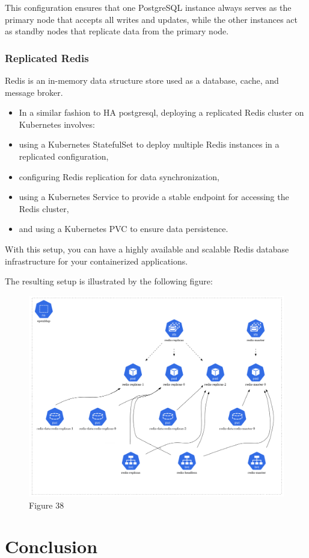 This configuration ensures that one PostgreSQL instance always serves as the primary node that accepts all writes and updates, while the other instances act as standby nodes that replicate data from the primary node. 

\subsubsection{Replicated Redis }

Redis is an in-memory data structure store used as a database, cache, and message broker. 
\begin{itemize}[label={--}]
\item In a similar fashion to HA postgresql, deploying a replicated Redis cluster on Kubernetes involves: 
\item using a Kubernetes StatefulSet to deploy multiple Redis instances in a replicated configuration, 
\item configuring Redis replication for data synchronization, 
\item using a Kubernetes Service to provide a stable endpoint for accessing the Redis cluster, 
\item and using a Kubernetes PVC to ensure data persistence. 
\end{itemize}
With this setup, you can have a highly available and scalable Redis database infrastructure for your containerized applications. 

The resulting setup is illustrated by the following figure: 

\begin{figure}[H]\centering
\includegraphics[width=1.0\textwidth,angle=00]{assets/f38.png}
\caption{Figure 38 }
\label{fig:f38}
\end{figure}


\section*{Conclusion}
